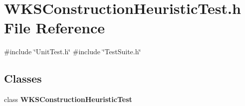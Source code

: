 \section{W\+K\+S\+Construction\+Heuristic\+Test.\+h File Reference}
\label{WKSConstructionHeuristicTest_8h}
{\ttfamily \#include \char`\"{}Unit\+Test.\+h\char`\"{}}\newline
{\ttfamily \#include \char`\"{}Test\+Suite.\+h\char`\"{}}\newline
\subsection*{Classes}
\begin{DoxyCompactItemize}
\item 
class \textbf{ W\+K\+S\+Construction\+Heuristic\+Test}
\end{DoxyCompactItemize}
